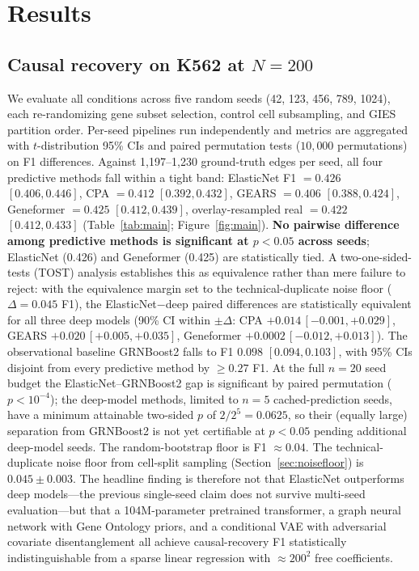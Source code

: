 \documentclass{article}
\theoremstyle{plain}
\theoremstyle{definition}
\theoremstyle{remark}
\begin{document}
\section{Results}
\label{sec:results}

\subsection{Causal recovery on K562 at $N{=}200$}
We evaluate all conditions across five random seeds (42, 123, 456, 789, 1024), each re-randomizing gene subset selection, control cell subsampling, and GIES partition order. Per-seed pipelines run independently and metrics are aggregated with $t$-distribution 95\% CIs and paired permutation tests ($10{,}000$ permutations) on F1 differences. Against 1{,}197--1{,}230 ground-truth edges per seed, all four predictive methods fall within a tight band: ElasticNet F1 $= 0.426$ $[0.406, 0.446]$, CPA $= 0.412$ $[0.392, 0.432]$, GEARS $= 0.406$ $[0.388, 0.424]$, Geneformer $= 0.425$ $[0.412, 0.439]$, overlay-resampled real $= 0.422$ $[0.412, 0.433]$ (Table~\ref{tab:main}; Figure~\ref{fig:main}). \textbf{No pairwise difference among predictive methods is significant at $p<0.05$ across seeds}; ElasticNet (0.426) and Geneformer (0.425) are statistically tied. A two-one-sided-tests (TOST) analysis establishes this as equivalence rather than mere failure to reject: with the equivalence margin set to the technical-duplicate noise floor ($\Delta = 0.045$ F1), the ElasticNet$-$deep paired differences are statistically equivalent for all three deep models (90\% CI within $\pm\Delta$: CPA $+0.014\,[-0.001, +0.029]$, GEARS $+0.020\,[+0.005, +0.035]$, Geneformer $+0.0002\,[-0.012, +0.013]$). The observational baseline GRNBoost2 falls to F1 $0.098$ $[0.094, 0.103]$, with 95\% CIs disjoint from every predictive method by $\geq 0.27$ F1. At the full $n=20$ seed budget the ElasticNet--GRNBoost2 gap is significant by paired permutation ($p<10^{-4}$); the deep-model methods, limited to $n=5$ cached-prediction seeds, have a minimum attainable two-sided $p$ of $2/2^5 = 0.0625$, so their (equally large) separation from GRNBoost2 is not yet certifiable at $p<0.05$ pending additional deep-model seeds. The random-bootstrap floor is F1 $\approx 0.04$. The technical-duplicate noise floor from cell-split sampling (Section~\ref{sec:noisefloor}) is $0.045 \pm 0.003$. The headline finding is therefore not that ElasticNet outperforms deep models---the previous single-seed claim does not survive multi-seed evaluation---but that a 104M-parameter pretrained transformer, a graph neural network with Gene Ontology priors, and a conditional VAE with adversarial covariate disentanglement all achieve causal-recovery F1 statistically indistinguishable from a sparse linear regression with $\approx\!200^2$ free coefficients.
\end{document}

